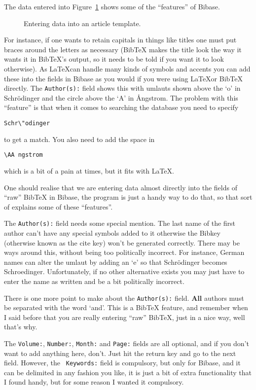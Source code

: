 \documentclass[12pt,a4paper]{book}
\newcommand {\fig}[1] {Figure~\ref{#1}}
\begin{document}
The data entered into \fig{fig:addArticleFull} shows some of the 
``features'' of Bibase.  
\begin{figure}[!ht]
\centerline{}
\caption{Entering data into an article template.}
\label{fig:addArticleFull}
\end{figure}
For instance, if one wants to retain 
capitals in things like titles one must put braces around the letters 
as necessary (BibTeX makes the title look the way it wants it in 
BibTeX's output, so it needs to be told if you want it to look 
otherwise).  As \LaTeX can handle many kinds of symbols and accents 
you can add these into the fields in Bibase as you would if you were 
using \LaTeX or BibTeX directly.  The {\tt Author(s):} field shows 
this with umlauts shown above the `o' in Schr\"odinger and the circle 
above the `A' in \AA ngstrom.  The problem with this ``feature'' is 
that when it comes to searching the database you need to specify 
\begin{verbatim}
Schr\"odinger
\end{verbatim}
to get a match.  You also need to add the space in 
\begin{verbatim}
\AA ngstrom
\end{verbatim}
which is a bit of a pain at times, but it fits with \LaTeX.  

One should realise that we are entering data almost directly into the 
fields of ``raw'' BibTeX in Bibase, the program is just a handy way to 
do that, so that sort of explains some of these ``features''.  

The {\tt Author(s):} field needs some special mention.  The last name 
of the first author can't have any special symbols added to it 
otherwise the Bibkey (otherwise known as the cite key) won't be 
generated correctly.  There may be ways around this, without being 
too politically incorrect.  For instance, German names can alter the 
umlaut by adding an `e' so that Schr\"odinger becomes Schroedinger.  
Unfortunately, if no other alternative exists you may just have to 
enter the name as written and be a bit politically incorrect.

There is one more point to make about the {\tt Author(s):} field.  
{\bf All} authors must be separated with the word `and'.  This is a 
BibTeX feature, and remember when I said before that you are really 
entering ``raw'' BibTeX, just in a nice way, well that's why.

The {\tt Volume:}, {\tt Number:}, {\tt Month:} and {\tt Page:} fields 
are all optional, and if you don't want to add anything here, don't.  
Just hit the return key and go to the next field.  However, the {\tt 
Keywords:} field is compulsory, but only for Bibase, and it can be 
delimited in any fashion you like, it is just a bit of extra 
functionality that I found handy, but for some reason I wanted it 
compulsory.
\end{document}
